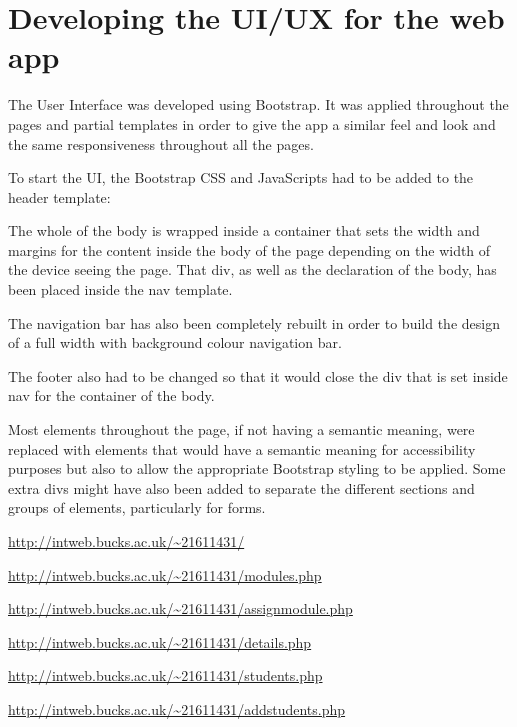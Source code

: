 \chapter{Developing the UI/UX for the web app}
The User Interface was developed using Bootstrap. It was applied throughout the pages and partial templates in order to give the app a similar feel and look and the same responsiveness throughout all the pages.

To start the UI, the Bootstrap CSS and JavaScripts had to be added to the header template:

\captionsetup{type=figure}


The whole of the body is wrapped inside a container that sets the width and margins for the content inside the body of the page depending on the width of the device seeing the page. That div, as well as the declaration of the body, has been placed inside the nav template.

The navigation bar has also been completely rebuilt in order to build the design of a full width with background colour navigation bar.

\captionsetup{type=figure}


The footer also had to be changed so that it would close the div that is set inside nav for the container of the body.

\captionsetup{type=figure}


Most elements throughout the page, if not having a semantic meaning, were replaced with elements that would have a semantic meaning for accessibility purposes but also to allow the appropriate Bootstrap styling to be applied. Some extra divs might have also been added to separate the different sections and groups of elements, particularly for forms.

\url{http://intweb.bucks.ac.uk/~21611431/}
\captionsetup{type=figure}


\url{http://intweb.bucks.ac.uk/~21611431/modules.php}
\captionsetup{type=figure}


\url{http://intweb.bucks.ac.uk/~21611431/assignmodule.php}
\captionsetup{type=figure}


\url{http://intweb.bucks.ac.uk/~21611431/details.php}
\captionsetup{type=figure}


\url{http://intweb.bucks.ac.uk/~21611431/students.php}
\captionsetup{type=figure}


\url{http://intweb.bucks.ac.uk/~21611431/addstudents.php}
\captionsetup{type=figure}

